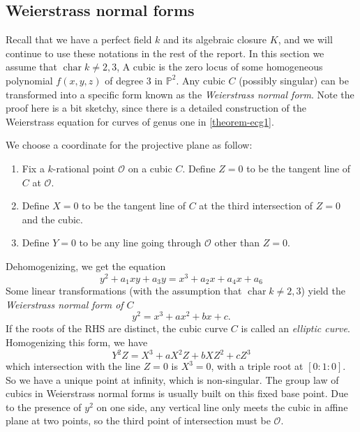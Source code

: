 \documentclass[12pt]{article}
\theoremstyle{remark}
\theoremstyle{definition}
\newcommand{\Pc}{\mathbb{P}}   %
\begin{document}
    \subsection{Weierstrass normal forms}
        Recall that we have a perfect field $k$ and its algebraic closure $K$, and we will continue to use these notations in the rest of the report. In this section we assume that $\operatorname{char} k\neq 2, 3$, A cubic is the zero locus of some homogeneous polynomial $f(x,y,z)$ of degree 3 in $\Pc^2$. Any cubic $C$ (possibly singular) can be transformed into a specific form known as the \textit{Weierstrass normal form}. Note the proof here is a bit sketchy, since there is a detailed construction of the Weierstrass equation for curves of genus one in \autoref{theorem-ecg1}.
        
        We choose a coordinate for the projective plane as follow: 
        \begin{enumerate}[\normalfont(1)]
            \item Fix a $k$-rational point $\mathcal{O}$ on a cubic $C$. Define $Z = 0$ to be the tangent line of $C$ at $\mathcal{O}$. 
            \item Define $X = 0$ to be the tangent line of $C$ at the third intersection of $Z=0$ and the cubic. 
            \item Define $Y = 0$ to be any line going through $\mathcal{O}$ other than $Z = 0$. 
        \end{enumerate}
        Dehomogenizing, we get the equation 
        $$y^2+a_1xy+a_3y=x^3+a_2x+a_4x+a_6$$
        Some linear transformations (with the assumption that $\operatorname{char} k\neq 2, 3$) yield the \textit{Weierstrass normal form of $C$}
        $$y^2 = x^3 + ax^2 + bx + c.$$ 
        If the roots of the RHS are distinct, the cubic curve $C$ is called an \textit{elliptic curve}.      Homogenizing this form, we have
        $$Y^2Z = X^3 + aX^2Z + bXZ^2 + cZ^3$$ 
        which intersection with the line $Z=0$ is $X^3 = 0$, with a triple root at $[0:1:0]$. So we have a unique point at infinity, which is non-singular. The group law of cubics in Weierstrass normal forms is usually built on this fixed base point. Due to the presence of $y^2$ on one side, any vertical line only meets the cubic in affine plane at two points, so the third point of intersection must be $\mathcal{O}$.
        
\end{document}
